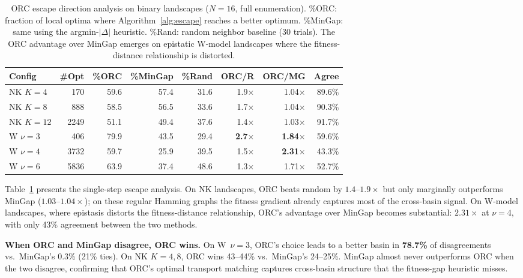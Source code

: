 \documentclass[runningheads]{llncs}
\begin{document}
\begin{table}[t]
\caption{ORC escape direction analysis on binary landscapes ($N\!=\!16$, full enumeration). \%ORC: fraction of local optima where Algorithm~\ref{alg:escape} reaches a better optimum. \%MinGap: same using the argmin-$|\Delta|$ heuristic. \%Rand: random neighbor baseline (30 trials). The ORC advantage over MinGap emerges on epistatic W-model landscapes where the fitness-distance relationship is distorted.}
\label{tab:escape}
\centering
\small
\begin{tabular}{@{}lrrrrrrr@{}}
\toprule
\textbf{Config} & \textbf{\#Opt} & \textbf{\%ORC} & \textbf{\%MinGap} & \textbf{\%Rand} & \textbf{ORC/R} & \textbf{ORC/MG} & \textbf{Agree} \\
\midrule
NK $K\!=\!4$     & 170   & 59.6 & 57.4 & 31.6 & 1.9$\times$ & 1.04$\times$ & 89.6\% \\
NK $K\!=\!8$     & 888   & 58.5 & 56.5 & 33.6 & 1.7$\times$ & 1.04$\times$ & 90.3\% \\
NK $K\!=\!12$    & 2249  & 51.1 & 49.4 & 37.6 & 1.4$\times$ & 1.03$\times$ & 91.7\% \\
\midrule
W $\nu\!=\!3$    & 406   & 79.9 & 43.5 & 29.4 & \textbf{2.7$\times$} & \textbf{1.84$\times$} & 59.6\% \\
W $\nu\!=\!4$    & 3732  & 59.7 & 25.9 & 39.5 & 1.5$\times$ & \textbf{2.31$\times$} & 43.3\% \\
W $\nu\!=\!6$    & 5836  & 63.9 & 37.4 & 48.6 & 1.3$\times$ & 1.71$\times$ & 52.7\% \\
\bottomrule
\end{tabular}
\end{table}

Table~\ref{tab:escape} presents the single-step escape analysis.
On NK landscapes, ORC beats random by $1.4$--$1.9\times$ but only marginally outperforms MinGap ($1.03$--$1.04\times$); on these regular Hamming graphs the fitness gradient already captures most of the cross-basin signal.
On W-model landscapes, where epistasis distorts the fitness-distance relationship, ORC's advantage over MinGap becomes substantial: $2.31\times$ at $\nu\!=\!4$, with only 43\% agreement between the two methods.

\textbf{When ORC and MinGap disagree, ORC wins.}
On W~$\nu\!=\!3$, ORC's choice leads to a better basin in \textbf{78.7\%} of disagreements vs.\ MinGap's 0.3\% (21\% ties).
On NK $K\!=\!4{,}8$, ORC wins 43--44\% vs.\ MinGap's 24--25\%.
MinGap almost never outperforms ORC when the two disagree, confirming that ORC's optimal transport matching captures cross-basin structure that the fitness-gap heuristic misses.
\end{document}
